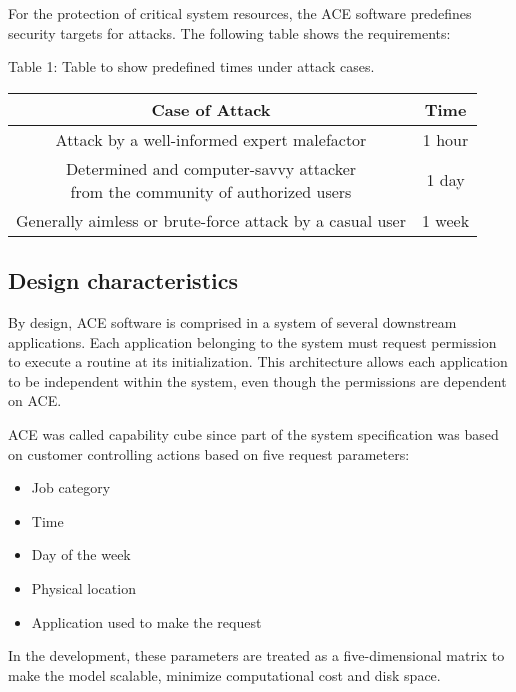 \documentclass[conference]{IEEEtran}
\begin{document}
For the protection of critical system resources, the ACE software predefines security targets for attacks. The following table shows the requirements:


\begin{table}[h!]
\centering
Table 1: Table to show predefined times under attack cases.

\begin{tabular}{||c c||}
 \hline
 Case of Attack & Time\\
 \hline\hline
 Attack by a well-informed expert malefactor & 1 hour \\[1ex]
 \makecell{Determined and computer-savvy attacker\\ from the community of authorized users} & 1 day \\ [2ex]
 Generally aimless or brute-force attack by a casual user & 1 week \\ [1ex]
 \hline
\end{tabular}
\end{table}




\subsection*{\quad Design characteristics}

By design, ACE software is comprised in a system of several downstream applications. Each application belonging to the system must request permission to execute a routine at its initialization. This architecture allows each application to be independent within the system, even though the permissions are dependent on ACE.

ACE was called capability cube since part of the system specification was based on customer controlling actions based on five request parameters:

\begin{itemize}
\item Job category
\item Time
\item Day of the week
\item Physical location
\item Application used to make the request \\

\end{itemize}

In the development, these parameters are treated as a five-dimensional matrix to make the model scalable, minimize computational cost and disk space.
\end{document}
